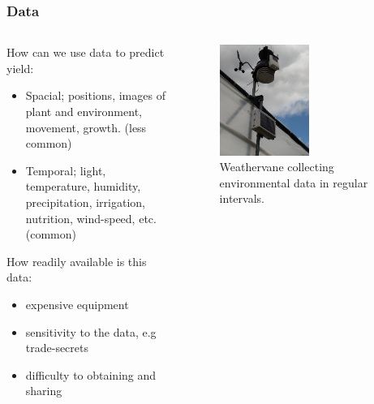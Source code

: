 \documentclass[aspectratio=169]{beamer}
\begin{document}
  \begin{frame}
    \frametitle{Data}
    \begin{columns}
      \begin{column}{0.5\textwidth}
        How can we use data to predict yield:
        \begin{itemize}
          \item Spacial; positions, images of plant and environment, movement, growth. (less common)
          \item Temporal; light, temperature, humidity, precipitation, irrigation, nutrition, wind-speed, etc. (common)
        \end{itemize}
        How readily available is this data:
        \begin{itemize}
          \item expensive equipment
          \item sensitivity to the data, e.g trade-secrets
          \item difficulty to obtaining and sharing
        \end{itemize}
      \end{column}
      \begin{column}{0.5\textwidth}
        \begin{figure}[th!]
          \centering
          \includegraphics[width=0.55\textwidth]{weather.jpg}
          \caption{Weathervane collecting environmental data in regular intervals. \autocite{repository}}
          \label{fig:yield}
        \end{figure}
      \end{column}
    \end{columns}
  \end{frame}
\end{document}
